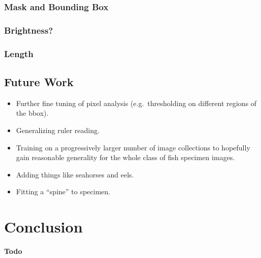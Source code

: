 \documentclass[screen,review]{acmart}
\begin{document}
\subsubsection{Mask and Bounding Box}

\subsubsection{Brightness?}

\subsubsection{Length}

\subsection{Future Work}
\begin{itemize}
    \item Further fine tuning of pixel analysis (e.g.\ thresholding on different regions of the bbox).
    \item Generalizing ruler reading.
    \item Training on a progressively larger number of image collections to hopefully gain reasonable generality for the whole class of fish specimen images.
    \item Adding things like seahorses and eels.
    \item Fitting a ``spine'' to specimen.
\end{itemize}
\section{Conclusion}
\textbf{Todo}




\end{document}
